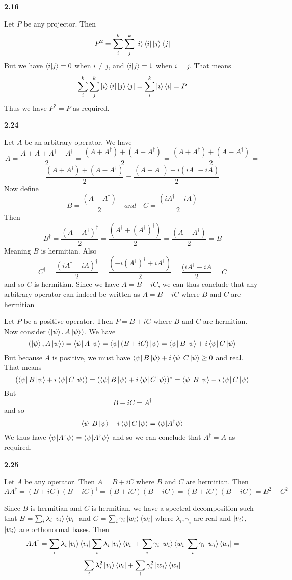 \textbf{2.16}

Let $P$ be any projector. Then \[ P^2 =\sum_{i}^k\sum_{j}^k\ket{i}\bra{i}\ket{j}\bra{j}\] But we have $\braket{i|j} = 0$ when $ i\neq j$, and $ \braket{i|j} = 1$ when $ i = j$. That means 
\[\sum_{i}^k\sum_{j}^k\ket{i}\bra{i}\ket{j}\bra{j} = \sum_{i}^k\ket{i}\bra{i} = P\]
Thus we have $P^2 = P$ as required.

\textbf{2.24}

Let $A$ be an arbitrary operator. We have \[A = \frac{A +A + A^\dag - A^\dag}{2} =\frac{(A +A^\dag)  + (A- A^\dag)}{2} = \frac{(A +A^\dag)  + (A- A^\dag)}{2} = \]\[\frac{(A +A^\dag)  + (A- A^\dag)}{2} = \frac{(A +A^\dag)  + i(iA^\dag-iA)}{2}\] Now define \[ B = \frac{(A +A^\dag)}{2}\quad and \quad C = \frac{(iA^\dag-iA)}{2}\]
Then \[B^\dag =\frac{(A +A^\dag)^\dag}{2} = \frac{(A^\dag + (A^\dag)^\dag)}{2} = \frac{(A+A^\dag)}{2}  = B\] Meaning $B$ is hermitian. Also \[C^\dag =\frac{(iA^\dag-iA)^\dag}{2} = \frac{(-i(A^\dag)^\dag+iA^\dag)}{2} =\frac{(iA^\dag-iA}{2} = C \] and so $C$ is hermitian. Since we have $ A = B + iC$, we can thus conclude that any arbitrary operator can indeed be written as $A = B+iC$ where $B$ and $C$ are hermitian

Let $ P$ be a positive operator. Then $ P = B+iC$ where $B$ and $C$ are hermitian. Now consider $(\ket{\psi},A\ket{\psi})$. We have \[ (\ket{\psi},A\ket{\psi}) =\bra{\psi}A\ket{\psi} =\bra{\psi}(B+iC)\ket{\psi} = \bra{\psi}B\ket{\psi}+i\bra{\psi}C\ket{\psi}\]But because $A$ is positive, we must have $\bra{\psi}B\ket{\psi}+i\bra{\psi}C\ket{\psi}\geq 0  $ and real. That means \[(\bra{\psi}B\ket{\psi}+i\bra{\psi}C\ket{\psi}) =(\bra{\psi}B\ket{\psi}+i\bra{\psi}C\ket{\psi})^* =\bra{\psi}B\ket{\psi}-i\bra{\psi}C\ket{\psi}\]But
\[B-iC = A^\dag\] and so 
\[\bra{\psi}B\ket{\psi}-i\bra{\psi}C\ket{\psi} = \braket{\psi|A^\dag\psi}\]We thus have $\braket{\psi|A^\dag\psi} = \braket{\psi|A^\dag\psi}$ and so we can conclude that $A^\dag = A$
as required.

\textbf{2.25}

Let $A$ be any operator. Then $A = B+iC$ where $B$ and $C$ are hermitian. Then 
\[AA^\dag = (B+iC)(B+iC)^\dag = (B+iC)(B-iC) =(B+iC)(B-iC)  = B^2 + C^2\]

Since $B$ is hermitian and $ C$ is hermitian, we have a spectral decomposition such that $B = \sum_i\lambda_i\ket{v_i}\bra{v_i}$ and $C = \sum_i\gamma_i \ket{w_i}\bra{w_i}$ where $\lambda_i, \gamma_i$ are real  and $\ket{v_i}$, $\ket{w_i}$ are orthonormal bases. Then 
\[AA^\dag = \sum_i\lambda_i\ket{v_i}\bra{v_i}\sum_i\lambda_i\ket{v_i}\bra{v_i} +\sum_i\gamma_i \ket{w_i}\bra{w_i}\sum_i\gamma_i \ket{w_i}\bra{w_i} = \]
\[\sum_{i}\lambda_i^2\ket{v_i}\bra{v_i} +\sum_{i}\gamma_i^2  \ket{w_i}\bra{w_i}\]

